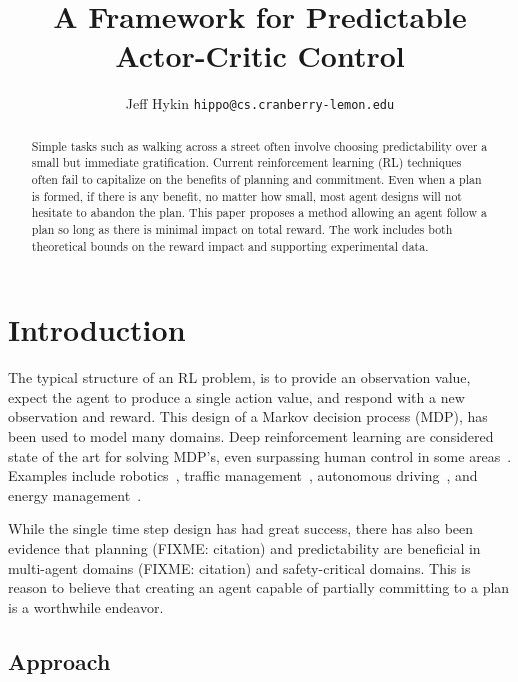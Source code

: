 \documentclass{article}
\title{A Framework for Predictable Actor-Critic Control}
\author{%
    Jeff Hykin
    \texttt{hippo@cs.cranberry-lemon.edu} \\
}
\begin{document}
    \maketitle
    \begin{abstract}
        Simple tasks such as walking across a street often involve choosing predictability over a small but immediate gratification. Current reinforcement learning (RL) techniques often fail to capitalize on the benefits of planning and commitment. Even when a plan is formed, if there is any benefit, no matter how small, most agent designs will not hesitate to abandon the plan. This paper proposes a method allowing an agent follow a plan so long as there is minimal impact on total reward. The work includes both theoretical bounds on the reward impact and supporting experimental data.
    \end{abstract}

    \section{Introduction}
    
        The typical structure of an RL problem, is to provide an observation value, expect the agent to produce a single action value, and respond with a new observation and reward. This design of a Markov decision process (MDP), has been used to model many domains. Deep reinforcement learning are considered state of the art for solving MDP's, even surpassing human control in some areas~\cite{haarnoja2018soft,schulman2017proximal,mnih2015human}. Examples include robotics~\cite{haarnoja2018soft,dey2021jirl}, traffic management~\cite{Ault2021signals,ault2020learning}, autonomous driving~\cite{8793742,sallab2017deep}, and energy management~\cite{gao2014machine,vandael2015reinforcement}. 
        
        While the single time step design has had great success, there has also been evidence that planning (FIXME: citation) and predictability are beneficial in multi-agent domains (FIXME: citation) and safety-critical domains. This is reason to believe that creating an agent capable of partially committing to a plan is a worthwhile endeavor.
        
        
        \subsection{Approach}
        
\end{document}
